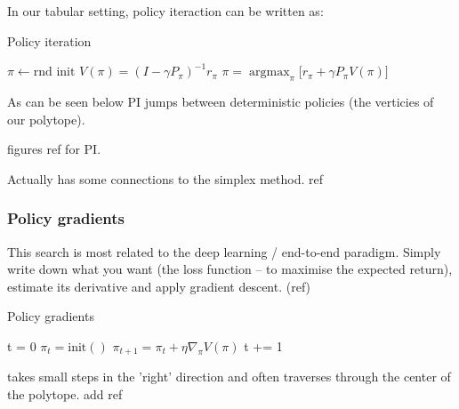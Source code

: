 In our tabular setting, policy iteraction can be written as:

\begin{algorithm}
\caption{Policy iteration}
\begin{algorithmic}[1]

    \State $\pi \leftarrow \text{rnd init}$
      \State $V(\pi) =  (I - \gamma P_{\pi})^{-1} r_{\pi}$ 
      \State $\pi = \mathop{\text{argmax}}_\pi \big[r_{\pi} + \gamma P_{\pi}V(\pi) \big]$ 
    \EndWhile
    \State \algorithmicreturn{ $\pi$}
\EndProcedure

\end{algorithmic}
\end{algorithm}

As can be seen below PI jumps between deterministic policies (the verticies of our polytope).

{\color{red}figures}
{\color{red}ref for PI.}

Actually has some connections to the simplex method. ref

\subsubsection{Policy gradients}

This search is most related to the deep learning / end-to-end paradigm.
Simply write down what you want (the loss function -- to maximise the expected return),
estimate its derivative and apply gradient descent. (ref)


\begin{algorithm}
\caption{Policy gradients}
\begin{algorithmic}[1]

  \State t = 0
  \State $\pi_t = \text{init}()$
    \State $\pi_{t+1} = \pi_t + \eta \nabla_{\pi} V(\pi)$ 
    \State t += 1
  \EndWhile
  \State {}
\EndProcedure

\end{algorithmic}
\end{algorithm}

takes small steps in the 'right' direction
and {\color{red}often traverses through the center of the polytope}.
add ref

